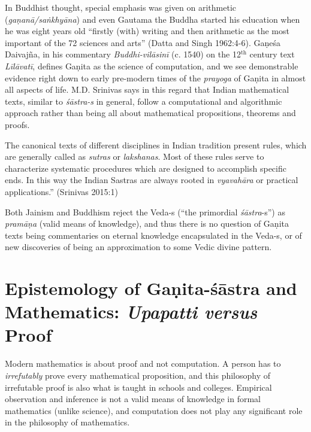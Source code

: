 In Buddhist thought, special emphasis was given on arithmetic ({\sl gaṇanā/saṅkhyāna}) and even Gautama the Buddha started his education when he was eight years old ``firstly (with) writing and then arithmetic as the most important of the 72 sciences and arts'' (Datta and Singh 1962:4-6). Gaṇeśa Daivajña, in his commentary {\sl Buddhi-vilāsinī} (c. 1540) on the 12$^{\text{th}}$ century text {\sl Līlāvatī}, defines Gaṇita as the science of computation, and we see demonstrable evidence right down to early pre-modern times of the {\sl prayoga} of Gaṇita in almost all aspects of life. M.D. Srinivas says in this regard that Indian mathematical texts, similar to {\sl śāstra-s} in general, follow a computational and algorithmic approach rather than being all about mathematical propositions, theorems and proofs. 
\begin{myquote}
The canonical texts of different disciplines in Indian tradition present rules, which are generally called as {\sl sutras} or {\sl lakshanas}. Most of these rules serve to characterize systematic procedures which are designed to accomplish specific ends. In this way the Indian Sastras are always rooted in {\sl vyavahāra} or practical applications.''
\hfill (Srinivas 2015:1)
\end{myquote}

Both Jainism and Buddhism reject the Veda-s (``the primordial {\sl śās\-tra}-s'') as {\sl pramāṇa} (valid means of knowledge), and thus there is no question of Gaṇita texts being commentaries on eternal knowledge encapsulated in the Veda-s, or of new discoveries of being an approximation to some Vedic divine pattern.

\section*{Epistemology of Gaṇita-śāstra and Mathematics: {\sl\bfseries Upapatti versus} Proof}

Modern mathematics is about proof and not computation. A person has to {\sl irrefutably} prove every mathematical proposition, and this philosophy of irrefutable proof is also what is taught in schools and colleges. Empirical observation and inference is not a valid means of knowledge in formal mathematics (unlike science), and computation does not play any significant role in the philosophy of mathematics. 

